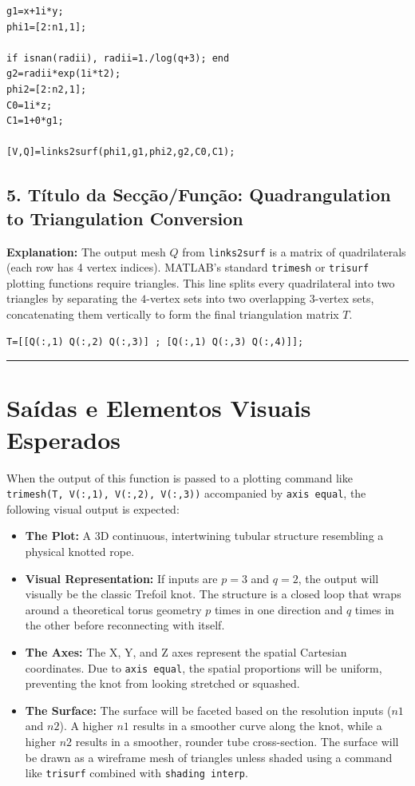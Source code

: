 \begin{lstlisting}
g1=x+1i*y;
phi1=[2:n1,1];

if isnan(radii), radii=1./log(q+3); end 
g2=radii*exp(1i*t2); 
phi2=[2:n2,1]; 
C0=1i*z; 
C1=1+0*g1; 

[V,Q]=links2surf(phi1,g1,phi2,g2,C0,C1); 
\end{lstlisting}

\subsection*{5. Título da Secção/Função: Quadrangulation to Triangulation Conversion}
\textbf{Explanation:} The output mesh $Q$ from \texttt{links2surf} is a matrix of quadrilaterals (each row has 4 vertex indices). MATLAB's standard \texttt{trimesh} or \texttt{trisurf} plotting functions require triangles. This line splits every quadrilateral into two triangles by separating the $4$-vertex sets into two overlapping $3$-vertex sets, concatenating them vertically to form the final triangulation matrix $T$.

\begin{lstlisting}
T=[[Q(:,1) Q(:,2) Q(:,3)] ; [Q(:,1) Q(:,3) Q(:,4)]];
\end{lstlisting}

\vspace{0.5cm}
\hrule
\vspace{0.5cm}

\section*{Saídas e Elementos Visuais Esperados}

When the output of this function is passed to a plotting command like \texttt{trimesh(T, V(:,1), V(:,2), V(:,3))} accompanied by \texttt{axis equal}, the following visual output is expected:

\begin{itemize}
    \item \textbf{The Plot:} A 3D continuous, intertwining tubular structure resembling a physical knotted rope. 
    \item \textbf{Visual Representation:} If inputs are $p=3$ and $q=2$, the output will visually be the classic Trefoil knot. The structure is a closed loop that wraps around a theoretical torus geometry $p$ times in one direction and $q$ times in the other before reconnecting with itself.
    \item \textbf{The Axes:} The X, Y, and Z axes represent the spatial Cartesian coordinates. Due to \texttt{axis equal}, the spatial proportions will be uniform, preventing the knot from looking stretched or squashed. 
    \item \textbf{The Surface:} The surface will be faceted based on the resolution inputs ($n1$ and $n2$). A higher $n1$ results in a smoother curve along the knot, while a higher $n2$ results in a smoother, rounder tube cross-section. The surface will be drawn as a wireframe mesh of triangles unless shaded using a command like \texttt{trisurf} combined with \texttt{shading interp}.
\end{itemize}
